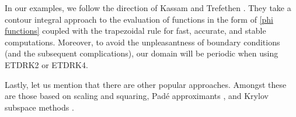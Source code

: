 In our examples, we follow the direction of Kassam and Trefethen \cite{kassam2005fourth}. They take a contour integral approach to the evaluation of functions in the form of \cref{phi functions} coupled with the trapezoidal rule for fast, accurate, and stable computations. Moreover, to avoid the unpleasantness of boundary conditions (and the subsequent complications), our domain will be periodic when using ETDRK2 or ETDRK4. 

Lastly, let us mention that there are other popular approaches. Amongst these are those based on scaling and squaring, Pad\'{e} approximants \cite{moler2003nineteen,higham2008functions}, and Krylov subspace methods  \cite{hochbruck1997krylov,sidje1998expokit,simoncini2007recent}.

